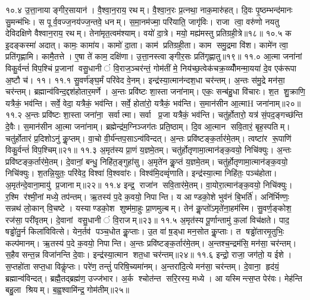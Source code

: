१०.४
उ॒त्ता॒नायाङ्गीर॒सायान॑। वै॒श्वा॒न॒राय॒ रथम्। वै॒श्वा॒न॒रः प्र॒त्नथा॒ नाक॒मारु॑हत्। दि॒वः पृ॒ष्ठम्भन्द॑मानः सु॒मन्म॑भिः। स पूर्व॒वज्ज॒नय॑ज्ज॒न्तवे॒ धनम्। स॒मा॒नम॑ज्मा॒ परि॑याति॒ जागृ॑विः। राजा त्वा॒ वरु॑णो नयतु देविदक्षिणे वैश्वान॒राय॒ रथम्। तेना॑मृत॒त्वम॑श्याम्। वयो॑ दा॒त्रे। मयो॒ मह्य॑मस्तु प्रतिग्रही॒त्रे॥१८॥
१०.५
क इ॒दङ्कस्मा॑ अदात्। कामः॒ कामा॑य। कामो॑ दा॒ता। काम॑ प्रतिग्रही॒ता। काम समु॒द्रमा वि॑श। कामे॑न त्वा॒ प्रति॑गृह्णामि। कामै॒तत्ते। ए॒षा ते॑ काम॒ दक्षि॑णा। उ॒त्ता॒नस्त्वाङ्गीर॒सः प्रति॑गृह्णातु॥१९॥
११.०
आ॒त्मा जना॑नां  विकु॒र्वन्तं॑  विप॒श्चिं प्र॒जानां वसु॒धानीं  वि॒राज॒ञ्चर॑न्तं॒  गोम॑तीं मे॒ निय॑च्छ॒त्वेक॑चक्र॒व्व्योँ॑मन्मा॒यया॑ दे॒व एक॑रूपा अ॒ष्टौ च॑। ११।
\anuvakamend
११.१
सु॒वर्ण॑ङ्घ॒र्मं परि॑वेद वे॒नम्। इन्द्र॑स्या॒त्मान॑न्दश॒धा चर॑न्तम्। अ॒न्तः स॑मु॒द्रे मन॑सा॒ चर॑न्तम्। ब्रह्मान्व॑विन्द॒द्दश॑होतार॒मर्णे। अ॒न्तः प्रवि॑ष्टः  शा॒स्ता जना॑नाम्। एकः॒ सन्ब॑हु॒धा वि॑चारः। श॒त शु॒क्राणि॒ यत्रैकं॒ भव॑न्ति। सर्वे॒ वेदा॒ यत्रैकं॒ भव॑न्ति। सर्वे॒ होता॑रो॒ यत्रैकं॒ भव॑न्ति। स॒मान॑सीन आ॒त्माH जना॑नाम्॥२०॥%
११.२
अ॒न्तः प्रवि॑ष्टः  शा॒स्ता जना॑ना॒ सर्वात्मा। सर्वा प्र॒जा यत्रैकं॒ भव॑न्ति। चतु॑र्\mbox{}होतारो॒ यत्र॑ सं॒पद॒ङ्गच्छ॑न्ति दे॒वैः। स॒मान॑सीन आ॒त्मा जना॑नाम्। ब्रह्मेन्द्र॑म॒ग्निञ्जग॑तः प्रति॒ष्ठाम्। दि॒व आ॒त्मान सवि॒तारं॒ बृह॒स्पतिम्। चतु॑र्\mbox{}होतारं प्र॒दिशोऽनु॑ कॢ॒प्तम्। वा॒चो वी॒र्य॑न्तप॒साऽन्व॑विन्दत्। अ॒न्तः प्रवि॑ष्टङ्क॒र्तार॑मे॒तम्। त्वष्टा॑र रू॒पाणि॑ विकु॒र्वन्तं॑ विप॒श्चिम्॥२१॥
११.३
अ॒मृत॑स्य प्रा॒णं य॒ज्ञमे॒तम्। चतु॑र्\mbox{}होतृणामा॒त्मान॑ङ्क॒वयो॒ निचि॑क्युः। अ॒न्तः प्रवि॑ष्टङ्क॒र्तार॑मे॒तम्। दे॒वानां॒ बन्धु॒ निहि॑त॒ङ्गुहा॑सु। अ॒मृते॑न कॢ॒प्तं य॒ज्ञमे॒तम्। चतु॑र्\mbox{}होतृणामा॒त्मान॑ङ्क॒वयो॒ निचि॑क्युः। श॒तन्नि॒युतः॒ परि॑वेद॒ विश्वा॑ वि॒श्ववा॑रः। विश्व॑मि॒दव्वृं॑णाति। इन्द्र॑स्या॒त्मा निहि॑तः॒ पञ्च॑होता। अ॒मृत॑न्दे॒वाना॒मायु॑ प्र॒जानाम्॥२२॥%
११.४
इन्द्र॒ राजा॑न सवि॒तार॑मे॒तम्। वा॒योरा॒त्मान॑ङ्क॒वयो॒ निचि॑क्युः। र॒श्मि र॑श्मी॒नां मध्ये॒ तप॑न्तम्। ऋ॒तस्य॑ प॒दे क॒वयो॒ निपान्ति। य आण्डको॒शे भुव॑नं बि॒भर्ति॑। अनि॑र्भिण्णः॒ सन्नथ॑ लो॒कान् वि॒चष्टे। यस्याण्डको॒श शुष्म॑मा॒हुः प्रा॒णमुल्बम्। तेन॑ कॢ॒प्तो॑ऽमृते॑ना॒हम॑स्मि। सु॒वर्ण॒ङ्कोश॒ रज॑सा॒ परी॑वृतम्। दे॒वानां वसु॒धानीं  वि॒राजम्॥२३॥%
११.५
अ॒मृत॑स्य पू॒र्णान्तामु॑ क॒लां  विच॑क्षते। पाद॒ षड्ढो॑तु॒र्न किला॑विवित्से। येन॒र्तव॑ पञ्च॒धोत कॢ॒प्ताः। उ॒त वा॑ ष़॒ड्धा मन॒सोत कॢ॒प्ताः। त षड्ढो॑तारमृ॒तुभिः॒ कल्प॑मानम्। ऋ॒तस्य॑ प॒दे क॒वयो॒ निपान्ति। अ॒न्तः प्रवि॑ष्टङ्क॒र्तार॑मे॒तम्। अ॒न्तश्च॒न्द्रम॑सि॒ मन॑सा॒ चर॑न्तम्। स॒हैव सन्त॒न्न विजा॑नन्ति दे॒वाः। इन्द्र॑स्या॒त्मान शत॒धा चर॑न्तम्॥२४॥%
११.६
इन्द्रो॒ राजा॒ जग॑तो॒ य ईशे। स॒प्तहो॑ता सप्त॒धा विकॢ॑प्तः। परे॑ण॒ तन्तुं॑ परिषि॒च्यमा॑नम्। अ॒न्तरा॑दि॒त्ये मन॑सा॒ चर॑न्तम्। दे॒वाना॒ हृद॑यं॒ ब्रह्मान्व॑विन्दत्। ब्रह्मै॒तद्ब्रह्म॑ण॒ उज्ज॑भार। अ॒र्क श्चोत॑न्त सरि॒रस्य॒ मध्ये। आ यस्मिन्त्स॒प्त पेर॑वः। मेह॑न्ति बहु॒ला श्रियम्। ब॒ह्व॒श्वामि॑न्द्र॒ गोम॑तीम्॥२५॥%
